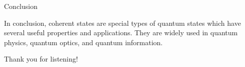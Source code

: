 \documentclass{loyola-beamer}
\begin{document}
\begin{frame}{Conclusion}

	In conclusion, coherent states are special types of quantum states which have several
	useful properties and applications. They are widely used in quantum physics, quantum optics,
	and quantum information.

\end{frame}


\begin{titleframe}{Thank you for listening!}

\end{titleframe}
\end{document}
